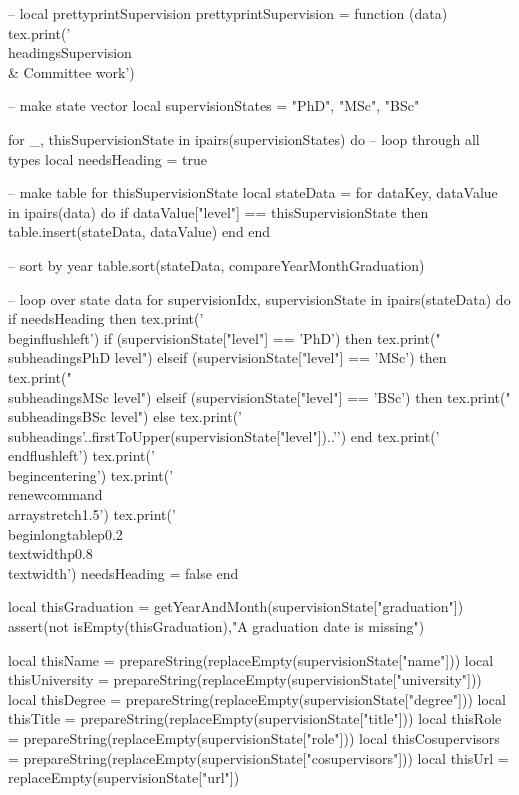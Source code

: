 \documentclass[letterpaper, 10pt]{article}
\newcommand{\headings}[1]{\section*{#1} \hrule \vspace{10pt}}
\newcommand{\subheadings}[1]{\textbf{#1} \vspace{5pt}}
\begin{document}
\begin{luacode}
	-- local prettyprintSupervision
	prettyprintSupervision = function (data)
		tex.print('\\headings{Supervision \\& Committee work}')

		-- make state vector
		local supervisionStates = {"PhD", "MSc", "BSc"}

		for _, thisSupervisionState in ipairs(supervisionStates) do 											-- loop through all types
			local needsHeading = true

			-- make table for thisSupervisionState
			local stateData = {}
			for dataKey, dataValue in ipairs(data) do
				if dataValue["level"] == thisSupervisionState then
					table.insert(stateData, dataValue)
				end
			end

			-- sort by year
			table.sort(stateData, compareYearMonthGraduation)

			-- loop over state data
			for supervisionIdx, supervisionState in ipairs(stateData) do
				if needsHeading then
					tex.print('\\begin{flushleft}')
					if (supervisionState["level"] == 'PhD') then
						tex.print("\\subheadings{PhD level}")
					elseif (supervisionState["level"] == 'MSc') then
						tex.print("\\subheadings{MSc level}")
					elseif (supervisionState["level"] == 'BSc') then
						tex.print("\\subheadings{BSc level}")
					else
						tex.print('\\subheadings{'..firstToUpper(supervisionState["level"])..'}')
					end
					tex.print('\\end{flushleft}')
					tex.print('\\begin{centering}')
					tex.print('\\renewcommand{\\arraystretch}{1.5}')
					tex.print('\\begin{longtable}{p{0.2\\textwidth}p{0.8\\textwidth}}')
					needsHeading = false
				end

				local thisGraduation = getYearAndMonth(supervisionState["graduation"])
				assert(not isEmpty(thisGraduation),"A graduation date is missing")

				local thisName		= prepareString(replaceEmpty(supervisionState["name"]))
				local thisUniversity = prepareString(replaceEmpty(supervisionState["university"]))
				local thisDegree	 = prepareString(replaceEmpty(supervisionState["degree"]))
				local thisTitle 	 = prepareString(replaceEmpty(supervisionState["title"]))
				local thisRole   	 = prepareString(replaceEmpty(supervisionState["role"]))
				local thisCosupervisors = prepareString(replaceEmpty(supervisionState["cosupervisors"]))
				local thisUrl 		 = replaceEmpty(supervisionState["url"])


\end{luacode}
\end{document}
